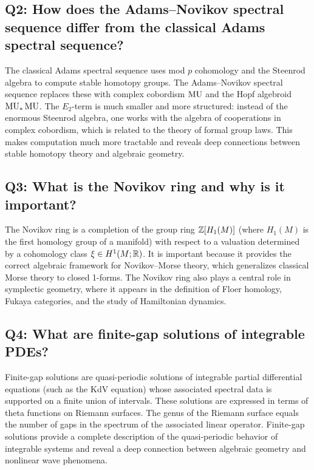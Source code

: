\subsection*{Q2: How does the Adams--Novikov spectral sequence differ from the classical Adams spectral sequence?}

The classical Adams spectral sequence uses mod \(p\) cohomology and the Steenrod algebra to compute stable homotopy groups. The Adams--Novikov spectral sequence replaces these with complex cobordism \(\operatorname{MU}\) and the Hopf algebroid \(\operatorname{MU}_*\operatorname{MU}\). The \(E_2\)-term is much smaller and more structured: instead of the enormous Steenrod algebra, one works with the algebra of cooperations in complex cobordism, which is related to the theory of formal group laws. This makes computation much more tractable and reveals deep connections between stable homotopy theory and algebraic geometry.

\subsection*{Q3: What is the Novikov ring and why is it important?}

The Novikov ring is a completion of the group ring \(\mathbb{Z}[H_1(M)]\) (where \(H_1(M)\) is the first homology group of a manifold) with respect to a valuation determined by a cohomology class \(\xi \in H^1(M; \mathbb{R})\). It is important because it provides the correct algebraic framework for Novikov--Morse theory, which generalizes classical Morse theory to closed 1-forms. The Novikov ring also plays a central role in symplectic geometry, where it appears in the definition of Floer homology, Fukaya categories, and the study of Hamiltonian dynamics.

\subsection*{Q4: What are finite-gap solutions of integrable PDEs?}

Finite-gap solutions are quasi-periodic solutions of integrable partial differential equations (such as the KdV equation) whose associated spectral data is supported on a finite union of intervals. These solutions are expressed in terms of theta functions on Riemann surfaces. The genus of the Riemann surface equals the number of gaps in the spectrum of the associated linear operator. Finite-gap solutions provide a complete description of the quasi-periodic behavior of integrable systems and reveal a deep connection between algebraic geometry and nonlinear wave phenomena.

